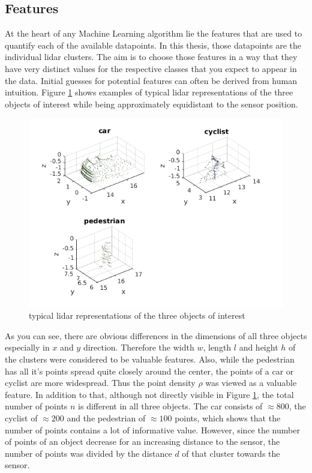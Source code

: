 \subsection{Features}

At the heart of any Machine Learning algorithm lie the features that are used to quantify each of the available datapoints. In this thesis, those datapoints are the individual lidar clusters. The aim is to choose those features in a way that they have very distinct values for the respective classes that you expect to appear in the data. Initial guesses for potential features can often be derived from human intuition. Figure \ref{fig:features_intuition} shows examples of typical lidar representations of the three objects of interest while being approximately equidistant to the sensor position.

\begin{figure}[H]
\centering
\includegraphics[width = \textwidth]{include/images/features_intuition.png}
\caption{typical lidar representations of the three objects of interest}
\label{fig:features_intuition}
\end{figure}

As you can see, there are obvious differences in the dimensions of all three objects especially in $x$ and $y$ direction. Therefore the width $w$, length $l$ and height $h$ of the clusters were considered to be valuable features.  Also, while the pedestrian has all it's points spread quite closely around the center, the points of a car or cyclist are more widespread. Thus the point density $\rho$ was viewed as a valuable feature. In addition to that, although not directly visible in Figure \ref{fig:features_intuition}, the total number of points $n$ is different in all three objects. The car consists of $\approx 800$, the cyclist of $\approx 200$ and the pedestrian of $\approx 100$ points, which shows that the number of points contains a lot of informative value. However, since the number of points of an object decrease for an increasing distance to the sensor, the number of points was divided by the distance $d$ of that cluster towards the sensor.

